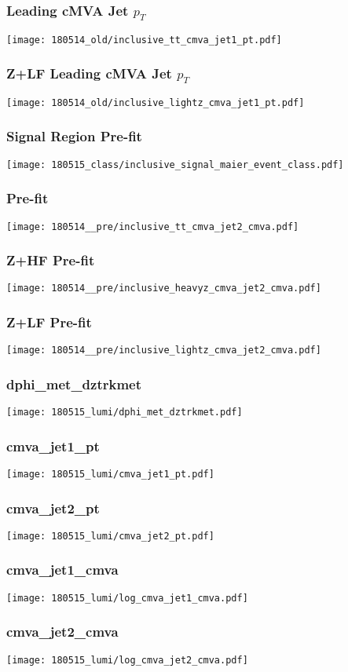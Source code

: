 \begin{frame}
   \frametitle{\ttbar Leading cMVA Jet $p_T$}
   \centering
   \texttt{[image: 180514\_old/inclusive\_tt\_cmva\_jet1\_pt.pdf]}
\end{frame}

\begin{frame}
   \frametitle{Z+LF Leading cMVA Jet $p_T$}
   \centering
   \texttt{[image: 180514\_old/inclusive\_lightz\_cmva\_jet1\_pt.pdf]}
\end{frame}

\begin{frame}
   \frametitle{Signal Region Pre-fit}
   \centering
   \texttt{[image: 180515\_class/inclusive\_signal\_maier\_event\_class.pdf]}
\end{frame}

\begin{frame}
   \frametitle{\ttbar Pre-fit}
   \centering
   \texttt{[image: 180514\_\_pre/inclusive\_tt\_cmva\_jet2\_cmva.pdf]}
\end{frame}

\begin{frame}
   \frametitle{Z+HF Pre-fit}
   \centering
   \texttt{[image: 180514\_\_pre/inclusive\_heavyz\_cmva\_jet2\_cmva.pdf]}
\end{frame}

\begin{frame}
   \frametitle{Z+LF Pre-fit}
   \centering
   \texttt{[image: 180514\_\_pre/inclusive\_lightz\_cmva\_jet2\_cmva.pdf]}
\end{frame}

\begin{frame}
   \frametitle{\small dphi\_met\_dztrkmet}
   \centering
   \texttt{[image: 180515\_lumi/dphi\_met\_dztrkmet.pdf]}
\end{frame}

\begin{frame}
   \frametitle{\small cmva\_jet1\_pt}
   \centering
   \texttt{[image: 180515\_lumi/cmva\_jet1\_pt.pdf]}
\end{frame}

\begin{frame}
   \frametitle{\small cmva\_jet2\_pt}
   \centering
   \texttt{[image: 180515\_lumi/cmva\_jet2\_pt.pdf]}
\end{frame}

\begin{frame}
   \frametitle{\small cmva\_jet1\_cmva}
   \centering
   \texttt{[image: 180515\_lumi/log\_cmva\_jet1\_cmva.pdf]}
\end{frame}

\begin{frame}
   \frametitle{\small cmva\_jet2\_cmva}
   \centering
   \texttt{[image: 180515\_lumi/log\_cmva\_jet2\_cmva.pdf]}
\end{frame}
